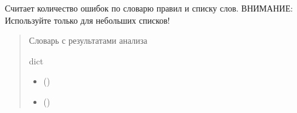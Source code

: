 \documentclass[a4paper,11pt,russian,openany,oneside]{sphinxmanual}
\begin{document}
\begin{savenotes}\begin{fulllineitems}
\label{\detokenize{processing_module:processing_module.calculate_data.make_processing}}
\pysigstartsignatures
\pysiglinewithargsret
{}
{\sphinxparamcomma {}}
{}
\pysigstopsignatures
\sphinxAtStartPar
Считает количество ошибок по словарю правил и списку слов.
ВНИМАНИЕ: Используйте только для небольших списков!
\begin{quote}\begin{description}
\sphinxAtStartPar
Словарь с результатами анализа

\sphinxAtStartPar
dict

\begin{itemize}
\item {} 
\sphinxAtStartPar
{} ()

\item {} 
\sphinxAtStartPar
{} ()

\end{itemize}

\end{description}\end{quote}

\end{fulllineitems}\end{savenotes}

\end{document}
